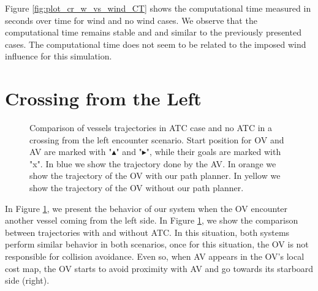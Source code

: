         Figure \ref{fig:plot_cr_w_vs_wind_CT} shows the computational time measured in seconds over time for wind and no wind cases. We observe that the computational time remains stable and and similar to the previously presented cases. The computational time does not seem to be related to the imposed wind influence for this simulation.
        
        
         


        
        \section{Crossing from the Left}
        
        \begin{figure}[H]
            \centering
            
            \caption{Comparison of vessels trajectories in \ac{ATC} case and no \ac{ATC} in a crossing from the left encounter scenario. Start position for \ac{OV} and \ac{AV} are marked with "$\blacktriangle$" and "$\blacktriangleright$", while their goals are marked with "x". In blue we show the trajectory done by the \ac{AV}. In orange we show the trajectory of the \ac{OV} with our path planner. In yellow we show the trajectory of the \ac{OV} without our path planner.}
            \label{fig:plot_cl_w_vs_wo}
        \end{figure}
        
        In Figure \ref{fig:plot_cl_w_vs_wo}, we present the behavior of our system when the \ac{OV} encounter another vessel coming from the left side. In Figure \ref{fig:plot_cl_w_vs_wo}, we show the comparison between trajectories with and without \ac{ATC}. In this situation, both systems perform similar behavior in both scenarios, once for this situation, the \ac{OV} is not responsible for collision avoidance. Even so, when \ac{AV} appears in the \ac{OV}'s local cost map, the \ac{OV} starts to avoid proximity with \ac{AV} and go towards its starboard side (right). 
        
